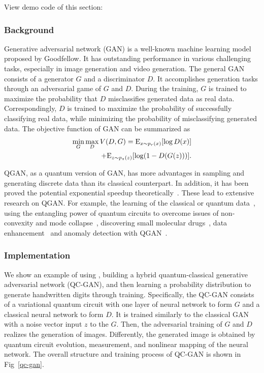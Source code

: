 View demo code of this section: 

\subsubsection{Background}
Generative adversarial network (GAN) is a well-known machine learning model proposed by Goodfellow. It has outstanding performance in various challenging tasks, especially in image generation and video generation. The general GAN consists of a generator ${G}$ and a discriminator ${D}$. It accomplishes generation tasks through an adversarial game of ${G}$ and ${D}$. During the training, ${G}$ is trained to maximize the probability that ${D}$ misclassifies generated data as real data. Correspondingly, ${D}$ is trained to maximize the probability of successfully classifying real data, while minimizing the probability of misclassifying generated data. The objective function of GAN can be summarized as
\begin{equation}
  \begin{split}
    \mathop {\min }\limits_G \mathop {\max }\limits_D V(D,G) = {\rm{ }}{{\rm{E}}_{x\sim{p_r}(x)}}[\log D(x)]
    \\+ {{\rm{E}}_{z\sim{p_z}(z)}}[\log (1 - D(G(z)))]. \label{eq1}
  \end{split}
\end{equation}

QGAN, as a quantum version of GAN, has more advantages in sampling and generating discrete data than its classical counterpart. In addition, it has been proved the potential exponential speedup theoretically~\cite{lloyd2018quantum}. These lead to extensive research on QGAN. For example, the learning of the classical or quantum data~\cite{benedetti2019adversarial, zeng2019learning, zoufal2019quantum,ahmed2021quantum}, using the entangling power of quantum circuits to overcome issues of non-convexity and mode collapse~\cite{niu2022entangling}, discovering small molecular drugs~\cite{li2021quantum}, data enhancement~\cite{nakaji2021quantum} and anomaly detection with QGAN~\cite{herr2021anomaly}.

\subsubsection{Implementation}
We show an example of using \MindQuantum, building a hybrid quantum-classical generative adversarial network (QC-GAN), and then learning a probability distribution to generate handwritten digits through training. Specifically, the QC-GAN consists of a variational quantum circuit with one layer of neural network to form ${G}$ and a classical neural network to form ${D}$. It is trained similarly to the classical GAN with a noise vector input ${z}$ to the ${G}$. Then, the adversarial training of ${G}$ and ${D}$ realizes the generation of images.
Differently, the generated image is obtained by quantum circuit evolution, measurement, and nonlinear mapping of the neural network. The overall structure and training process of QC-GAN is shown in Fig~\ref{qc-gan}.

